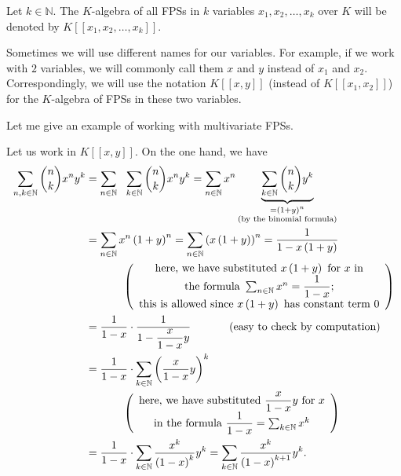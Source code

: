 \begin{definition}
Let $k\in\mathbb{N}$. The $K$-algebra of all FPSs in $k$ variables
$x_{1},x_{2},\ldots,x_{k}$ over $K$ will be denoted by $K\left[  \left[
x_{1},x_{2},\ldots,x_{k}\right]  \right]  $.
\end{definition}

Sometimes we will use different names for our variables. For example, if we
work with $2$ variables, we will commonly call them $x$ and $y$ instead of
$x_{1}$ and $x_{2}$. Correspondingly, we will use the notation $K\left[
\left[  x,y\right]  \right]  $ (instead of $K\left[  \left[  x_{1}%
,x_{2}\right]  \right]  $) for the $K$-algebra of FPSs in these two variables.

Let me give an example of working with multivariate FPSs.

Let us work in $K\left[  \left[  x,y\right]  \right]  $. On the one hand, we
have%
\begin{align*}
\sum_{n,k\in\mathbb{N}}\dbinom{n}{k}x^{n}y^{k}  &  =\sum_{n\in\mathbb{N}%
}\ \ \sum_{k\in\mathbb{N}}\dbinom{n}{k}x^{n}y^{k}=\sum_{n\in\mathbb{N}}%
x^{n}\underbrace{\sum_{k\in\mathbb{N}}\dbinom{n}{k}y^{k}}_{\substack{=\left(
1+y\right)  ^{n}\\\text{(by the binomial formula)}}}\\
&  =\sum_{n\in\mathbb{N}}x^{n}\left(  1+y\right)  ^{n}=\sum_{n\in\mathbb{N}%
}\left(  x\left(  1+y\right)  \right)  ^{n}=\dfrac{1}{1-x\left(  1+y\right)
}\\
&  \ \ \ \ \ \ \ \ \ \ \left(
\begin{array}
[c]{c}%
\text{here, we have substituted }x\left(  1+y\right)  \text{ for }x\text{
in}\\
\text{the formula }\sum_{n\in\mathbb{N}}x^{n}=\dfrac{1}{1-x}\text{;}\\
\text{this is allowed since }x\left(  1+y\right)  \text{ has constant term }0
\end{array}
\right) \\
&  =\dfrac{1}{1-x}\cdot\dfrac{1}{1-\dfrac{x}{1-x}y}\ \ \ \ \ \ \ \ \ \ \left(
\text{easy to check by computation}\right) \\
&  =\dfrac{1}{1-x}\cdot\sum_{k\in\mathbb{N}}\left(  \dfrac{x}{1-x}y\right)
^{k}\\
&  \ \ \ \ \ \ \ \ \ \ \left(
\begin{array}
[c]{c}%
\text{here, we have substituted }\dfrac{x}{1-x}y\text{ for }x\\
\text{in the formula }\dfrac{1}{1-x}=\sum_{k\in\mathbb{N}}x^{k}%
\end{array}
\right) \\
&  =\dfrac{1}{1-x}\cdot\sum_{k\in\mathbb{N}}\dfrac{x^{k}}{\left(  1-x\right)
^{k}}y^{k}=\sum_{k\in\mathbb{N}}\dfrac{x^{k}}{\left(  1-x\right)  ^{k+1}}%
y^{k}.
\end{align*}
